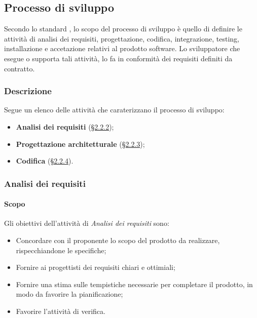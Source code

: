 \subsection{Processo di sviluppo}
Secondo lo standard \cite{bib:ISO12207_1997}, lo scopo del processo di sviluppo è quello di
definire le attività di analisi dei requisiti, progettazione, codifica, integrazione, testing,
installazione e accetazione relativi al prodotto software. Lo sviluppatore che esegue o supporta tali attività,
lo fa in conformità dei requisiti definiti da contratto.

    \subsubsection{Descrizione}
    Segue un elenco delle attività che caraterizzano il processo di sviluppo:
        \begin{itemize}
            \item \textbf{Analisi dei requisiti} (\hyperref[sec:AdR]{§2.2.2});
            \item \textbf{Progettazione architetturale} (\hyperref[sec:pa]{§2.2.3});
            \item \textbf{Codifica} (\hyperref[sec:coding]{§2.2.4}).
        \end{itemize}


    \subsubsection{Analisi dei requisiti} \label{sec:AdR}

    \paragraph{Scopo}
    \noindent
    Gli obiettivi dell'attività di \textit{Analisi dei requisiti} sono:
        \begin{itemize}
            \item Concordare con il proponente lo scopo del prodotto da realizzare, rispecchiandone le specifiche;
            \item Fornire ai progettisti dei requisiti chiari e ottimiali;
            \item Fornire una stima sulle tempistiche necessarie per completare il prodotto, in modo da favorire la pianificazione;
            \item Favorire l'attività di verifica.
        \end{itemize}

